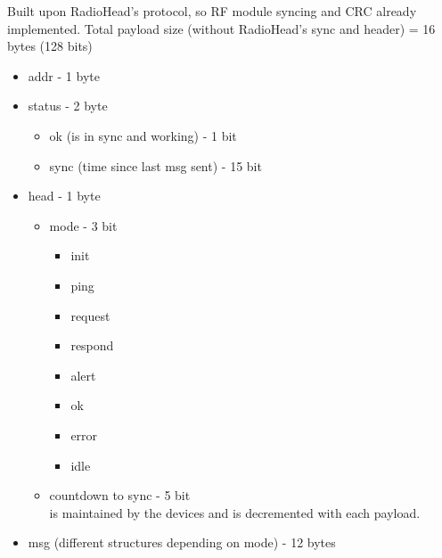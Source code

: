 Built upon RadioHead's protocol, so RF module syncing and CRC already implemented.
Total payload size (without RadioHead's sync and header) = 16 bytes (128 bits)
\begin{itemize}
    \item addr - 1 byte
    \item status - 2 byte
    \begin{itemize}
        \item ok (is in sync and working) - 1 bit
        \item sync (time since last msg sent) - 15 bit
    \end{itemize}
    \item head - 1 byte
    \begin{itemize}
        \item mode - 3 bit
        \begin{itemize}
            \item init 
            \item ping
            \item request
            \item respond
            \item alert
            \item ok
            \item error
            \item idle
        \end{itemize}
        \item countdown to sync - 5 bit \\
        is maintained by the devices and is decremented with each payload.
    \end{itemize}
    \item msg (different structures depending on mode) - 12 bytes
\end{itemize}

\bigskip
{}
